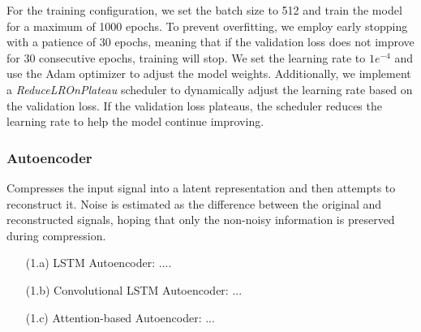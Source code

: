 For the training configuration, we set the batch size to 512 and train the model for a maximum of 1000 epochs. To prevent overfitting, we employ early stopping with a patience of 30 epochs, meaning that if the validation loss does not improve for 30 consecutive epochs, training will stop. We set the learning rate to $1e^{-4}$ and use the Adam optimizer to adjust the model weights. Additionally, we implement a \emph{ReduceLROnPlateau} scheduler to dynamically adjust the learning rate based on the validation loss. If the validation loss plateaus, the scheduler reduces the learning rate to help the model continue improving.


\subsubsection{Autoencoder}
Compresses the input signal into a latent representation and then attempts to reconstruct it. Noise is estimated as the difference between the original and reconstructed signals, hoping that only the non-noisy information is preserved during compression. 



\begin{enumerate}
    \item[(1.a)] LSTM Autoencoder: ....
    \vspace{-0.2cm}
    \item[(1.b)] Convolutional LSTM Autoencoder: ...
    \vspace{-0.2cm}
    \item[(1.c)] Attention-based Autoencoder: ...
\end{enumerate}

